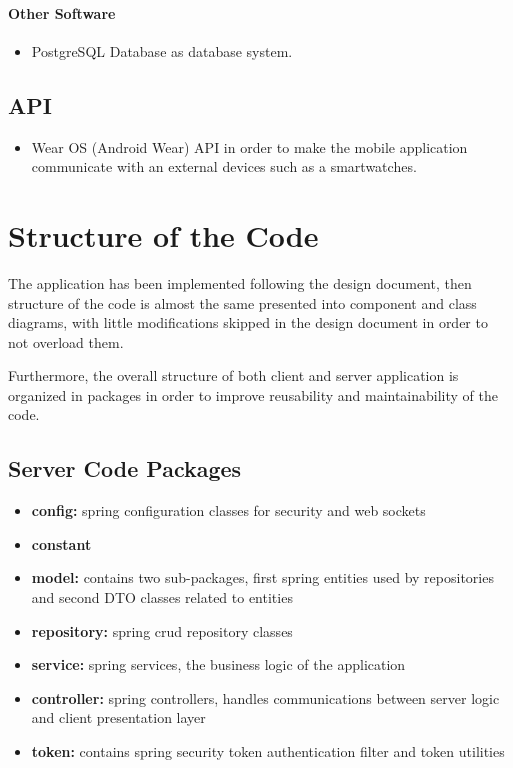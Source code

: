 \documentclass[a4paper]{article}
\begin{document}
\paragraph{Other Software}
\begin{itemize}
    \item PostgreSQL Database as database system.
\end{itemize}

\subsection{API}
\begin{itemize}
    \item Wear OS (Android Wear) API in order to make the mobile application communicate with an external devices such as a smartwatches.
\end{itemize}

\newpage
\section{Structure of the Code}
The application has been implemented following the design document, then structure of the code is almost the same presented into component and class diagrams, with little modifications skipped in the design document in order to not overload them.

Furthermore, the overall structure of both client and server application is organized in packages in order to improve reusability and maintainability of the code.

\subsection{Server Code Packages}
\begin{itemize}
\item \textbf{config:} spring configuration classes for security and web sockets
\item \textbf{constant}
\item \textbf{model:} contains two sub-packages, first spring entities used by repositories and second DTO classes related to entities
\item \textbf{repository:} spring crud repository classes
\item \textbf{service:} spring services, the business logic of the application
\item \textbf{controller:} spring controllers, handles communications between server logic and client presentation layer
\item \textbf{token:} contains spring security token authentication filter and token utilities
\end{itemize}
\end{document}
